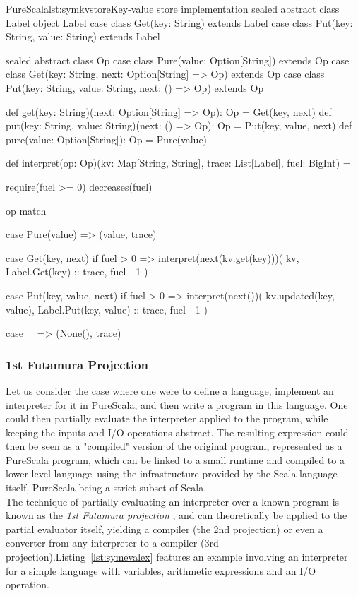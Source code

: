 \documentclass[a4paper,twoside]{article}
\newcommand{\RefCode}[1]{Listing~\ref{#1}}
\begin{document}
\begin{Code}{PureScala}{lst:symkvstore}{Key-value store implementation}
sealed abstract class Label
object Label {
  case class Get(key: String)                extends Label
  case class Put(key: String, value: String) extends Label
}

sealed abstract class Op
case class Pure(value: Option[String])                     extends Op
case class Get(key: String, next: Option[String] => Op)    extends Op
case class Put(key: String, value: String, next: () => Op) extends Op

def get(key: String)(next: Option[String] => Op): Op    = Get(key, next)
def put(key: String, value: String)(next: () => Op): Op = Put(key, value, next)
def pure(value: Option[String]): Op                     = Pure(value)

def interpret(op: Op)(kv: Map[String, String], trace: List[Label], fuel: BigInt) = {
  require(fuel >= 0)
  decreases(fuel)

  op match {
    case Pure(value) =>
      (value, trace)

    case Get(key, next) if fuel > 0 =>
      interpret(next(kv.get(key)))(
        kv,
        Label.Get(key) :: trace,
        fuel - 1
    )

    case Put(key, value, next) if fuel > 0 =>
      interpret(next())(
      	kv.updated(key, value),
        Label.Put(key, value) :: trace,
        fuel - 1
     )

    case _ =>
      (None(), trace)
  }
}
\end{Code}

\subsubsection{1st Futamura Projection}

Let us consider the case where one were to define a language, implement an interpreter for it in PureScala, and then write a program in this language. One could then partially evaluate the interpreter applied to the program, while keeping the inputs and I/O operations abstract. The resulting expression could then be seen as a "compiled" version of the original program, represented as a PureScala program, which can be linked to a small runtime and compiled to a lower-level language using the infrastructure provided by the Scala language itself, PureScala being a strict subset of Scala.\\

The technique of partially evaluating an interpreter over a known program is known as the \textit{1st Futamura projection} \cite{futamura}, and can theoretically be applied to the partial evaluator itself, yielding a compiler (the 2nd projection) or even a converter from any interpreter to a compiler (3rd projection).\RefCode{lst:symevalex} features an example involving an interpreter for a simple language with variables, arithmetic expressions and an I/O operation.
\end{document}
